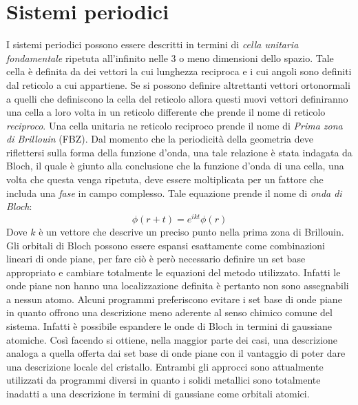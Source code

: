 \documentclass[oneside]{amsbook}
\numberwithin{section}{chapter}
\numberwithin{equation}{section}
\numberwithin{figure}{section}
\begin{document}
\section{Sistemi periodici}
I sistemi periodici possono essere descritti in termini di \emph{cella unitaria fondamentale} ripetuta all'infinito nelle $3$ o meno dimensioni dello spazio. Tale cella è definita da dei vettori la cui lunghezza reciproca e i cui angoli sono definiti dal reticolo a cui appartiene.
Se si possono definire altrettanti vettori ortonormali a quelli che definiscono la cella del reticolo allora questi nuovi vettori definiranno una cella a loro volta in un reticolo differente che prende il nome di reticolo \emph{reciproco}. Una cella unitaria ne reticolo reciproco prende il nome di \emph{Prima zona di Brillouin} (FBZ).
Dal momento che la periodicità della geometria deve riflettersi sulla forma della funzione d'onda, una tale relazione è stata indagata da Bloch, il quale è giunto alla conclusione che la funzione d'onda di una cella, una volta che questa venga ripetuta, deve essere moltiplicata per un fattore che includa una \emph{fase} in campo complesso. Tale equazione prende il nome di \emph{onda di Bloch}:
\begin{equation}
\phi (r+t) = e^{ikt}\phi(r)
\end{equation}
Dove $k$ è un vettore che descrive un preciso punto nella prima zona di Brillouin.
Gli orbitali di Bloch possono essere espansi esattamente come combinazioni lineari di onde piane, per fare ciò è però necessario definire un set base appropriato e cambiare totalmente le equazioni del metodo utilizzato. Infatti le onde piane non hanno una localizzazione definita è pertanto non sono assegnabili a nessun atomo.
Alcuni programmi preferiscono evitare i set base di onde piane in quanto offrono una descrizione meno aderente al senso chimico comune del sistema. Infatti è possibile espandere le onde di Bloch in termini di gaussiane atomiche. Così facendo si ottiene, nella maggior parte dei casi, una descrizione analoga a quella offerta dai set base di onde piane con il vantaggio di poter dare una descrizione locale del cristallo.
Entrambi gli approcci sono attualmente utilizzati da programmi diversi in quanto i solidi metallici sono totalmente inadatti a una descrizione in termini di gaussiane come orbitali atomici.
\end{document}
